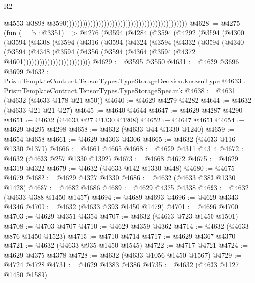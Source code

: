 \begin{lexlean}{R2}
\begin{coremodule}
                                                                                              @4553
                                                                                              @3898
                                                                                              @3590)))))))))))))))))))))))))))))))))))))))))))))
@4628 := @4275
    (fun (__b : @3351) =>
    @4276
      (@3594
        (@4284
          (@3594
            (@4292
              (@3594
                (@4300
                  (@3594
                    (@4308
                      (@3594
                        (@4316
                          (@3594
                            (@4324
                              (@3594
                                (@4332
                                  (@3594
                                    (@4340
                                      (@3594
                                        (@4348
                                          (@3594
                                            (@4356
                                              (@3594
                                                (@4364 (@3594 (@4372 @4601)))))))))))))))))))))))))
@4629 := @3595 @3550
@4631 := @4629 @3696 @3699
@4632 := PrismTemplateContract.TensorTypes.TypeStorageDecision.knownType
@4633 := PrismTemplateContract.TensorTypes.TypeStorageSpec.mk
@4638 := @4631 (@4632 (@4633 @178 @21 @50))
@4640 := @4629 @4279 @4282
@4644 := @4632 (@4633 @21 @21 @27)
@4645 := @4640 @4644
@4647 := @4629 @4287 @4290
@4651 := @4632 (@4633 @27 @1330 @1208)
@4652 := @4647 @4651
@4654 := @4629 @4295 @4298
@4658 := @4632 (@4633 @44 @1330 @1240)
@4659 := @4654 @4658
@4661 := @4629 @4303 @4306
@4665 := @4632 (@4633 @116 @1330 @1370)
@4666 := @4661 @4665
@4668 := @4629 @4311 @4314
@4672 := @4632 (@4633 @257 @1330 @1392)
@4673 := @4668 @4672
@4675 := @4629 @4319 @4322
@4679 := @4632 (@4633 @142 @1330 @448)
@4680 := @4675 @4679
@4682 := @4629 @4327 @4330
@4686 := @4632 (@4633 @383 @1330 @1428)
@4687 := @4682 @4686
@4689 := @4629 @4335 @4338
@4693 := @4632 (@4633 @388 @1450 @1457)
@4694 := @4689 @4693
@4696 := @4629 @4343 @4346
@4700 := @4632 (@4633 @393 @1450 @1479)
@4701 := @4696 @4700
@4703 := @4629 @4351 @4354
@4707 := @4632 (@4633 @723 @1450 @1501)
@4708 := @4703 @4707
@4710 := @4629 @4359 @4362
@4714 := @4632 (@4633 @876 @1450 @1523)
@4715 := @4710 @4714
@4717 := @4629 @4367 @4370
@4721 := @4632 (@4633 @935 @1450 @1545)
@4722 := @4717 @4721
@4724 := @4629 @4375 @4378
@4728 := @4632 (@4633 @1056 @1450 @1567)
@4729 := @4724 @4728
@4731 := @4629 @4383 @4386
@4735 := @4632 (@4633 @1127 @1450 @1589)

\end{coremodule}
\end{lexlean}
